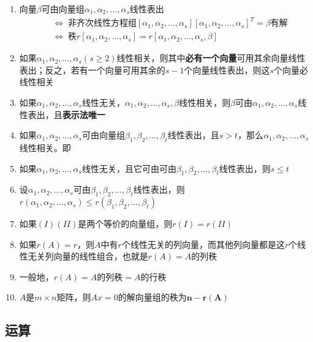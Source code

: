 \documentclass[a4paper,12pt]{article}
\begin{document}
\begin{enumerate}
        \item 向量$\beta$可由向量组$\alpha_1, \alpha_2, \dots, \alpha_s$线性表出
        \begin{align*}
            &\Leftrightarrow\; \text{非齐次线性方程组} [\alpha_1, \alpha_2, \dots, \alpha_s][\alpha_1, \alpha_2, \dots, \alpha_s]^T = \beta \text{有解} \\
            &\Leftrightarrow\; \text{秩} r[\alpha_1, \alpha_2, \dots, \alpha_s] = r[\alpha_1, \alpha_2, \dots, \alpha_s, \beta]
        \end{align*}
        \item 如果$\alpha_1, \alpha_2, \dots, \alpha_s (s \ge 2)$线性相关，则其中\textbf{必有一个向量}可用其余向量线性表出；反之，若有一个向量可用其余的$s-1$个向量线性表出，则这$s$个向量必线性相关
        \item 如果$\alpha_1, \alpha_2, \dots, \alpha_s$线性无关，$\alpha_1, \alpha_2, \dots, \alpha_s, \beta$线性相关，则$\beta$可由$\alpha_1, \alpha_2, \dots, \alpha_s$线性表出，且\textbf{表示法唯一}
        \item 如果$\alpha_1, \alpha_2, \dots, \alpha_s$可由向量组$\beta_1, \beta_2, \dots, \beta_t$线性表出，且$s > t$，那么$\alpha_1, \alpha_2, \dots, \alpha_s$线性相关。即{}
        \item 如果$\alpha_1, \alpha_2, \dots, \alpha_s$线性无关，且它可由可由$\beta_1, \beta_2, \dots, \beta_t$线性表出，则$s \le t$
        \item 设$\alpha_1, \alpha_2, \dots, \alpha_s$可由$\beta_1, \beta_2, \dots, \beta_t$线性表出，则$r(\alpha_1, \alpha_2, \dots, \alpha_s) \le r(\beta_1, \beta_2, \dots, \beta_t)$
        \item 如果$(I)(II)$是两个等价的向量组，则$r(I) = r(II)$
        \item 如果$r(A) = r$，则$A$中有$r$个线性无关的列向量，而其他列向量都是这$r$个线性无关列向量的线性组合，也就是$r(A) = A$的列秩
        \item 一般地，$r(A) = A \text{的列秩} = A \text{的行秩}$
        \item $A$是$m \times n$矩阵，则$Ax = 0$的解向量组的秩为$\mathbf{n - r(A)}$
    \end{enumerate}

    \subsection{运算}
\end{document}
